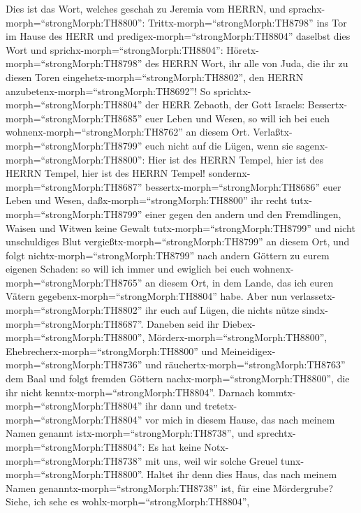  Dies ist das Wort, welches geschah zu Jeremia vom HERRN,
und sprachx-morph=``strongMorph:TH8800'': 
Trittx-morph=``strongMorph:TH8798'' ins Tor im Hause des HERR und
predigex-morph=``strongMorph:TH8804'' daselbst dies Wort und
sprichx-morph=``strongMorph:TH8804'':
Höretx-morph=``strongMorph:TH8798'' des HERRN Wort, ihr alle von Juda,
die ihr zu diesen Toren eingehetx-morph=``strongMorph:TH8802'', den
HERRN anzubetenx-morph=``strongMorph:TH8692''!  So
sprichtx-morph=``strongMorph:TH8804'' der HERR Zebaoth, der Gott
Israels: Bessertx-morph=``strongMorph:TH8685'' euer Leben und Wesen, so
will ich bei euch wohnenx-morph=``strongMorph:TH8762'' an diesem Ort.
 Verlaßtx-morph=``strongMorph:TH8799'' euch nicht auf die
Lügen, wenn sie sagenx-morph=``strongMorph:TH8800'': Hier ist des HERRN
Tempel, hier ist des HERRN Tempel, hier ist des HERRN Tempel!
 sondernx-morph=``strongMorph:TH8687''
bessertx-morph=``strongMorph:TH8686'' euer Leben und Wesen,
daßx-morph=``strongMorph:TH8800'' ihr recht
tutx-morph=``strongMorph:TH8799'' einer gegen den andern 
und den Fremdlingen, Waisen und Witwen keine Gewalt
tutx-morph=``strongMorph:TH8799'' und nicht unschuldiges Blut
vergießtx-morph=``strongMorph:TH8799'' an diesem Ort, und folgt
nichtx-morph=``strongMorph:TH8799'' nach andern Göttern zu eurem eigenen
Schaden:  so will ich immer und ewiglich bei euch
wohnenx-morph=``strongMorph:TH8765'' an diesem Ort, in dem Lande, das
ich euren Vätern gegebenx-morph=``strongMorph:TH8804'' habe.
 Aber nun verlassetx-morph=``strongMorph:TH8802'' ihr euch
auf Lügen, die nichts nütze sindx-morph=``strongMorph:TH8687''.
 Daneben seid ihr Diebex-morph=``strongMorph:TH8800'',
Mörderx-morph=``strongMorph:TH8800'',
Ehebrecherx-morph=``strongMorph:TH8800'' und
Meineidigex-morph=``strongMorph:TH8736'' und
räuchertx-morph=``strongMorph:TH8763'' dem Baal und folgt fremden
Göttern nachx-morph=``strongMorph:TH8800'', die ihr nicht
kenntx-morph=``strongMorph:TH8804''.  Darnach
kommtx-morph=``strongMorph:TH8804'' ihr dann und
tretetx-morph=``strongMorph:TH8804'' vor mich in diesem Hause, das nach
meinem Namen genannt istx-morph=``strongMorph:TH8738'', und
sprechtx-morph=``strongMorph:TH8804'': Es hat keine
Notx-morph=``strongMorph:TH8738'' mit uns, weil wir solche Greuel
tunx-morph=``strongMorph:TH8800''.  Haltet ihr denn dies
Haus, das nach meinem Namen genanntx-morph=``strongMorph:TH8738'' ist,
für eine Mördergrube? Siehe, ich sehe es
wohlx-morph=``strongMorph:TH8804'',
